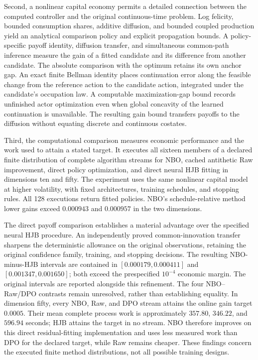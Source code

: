 Second, a nonlinear capital economy permits a detailed connection between the computed controller and the original continuous-time problem. Log felicity, bounded consumption shares, additive diffusion, and bounded coupled production yield an analytical comparison policy and explicit propagation bounds. A policy-specific payoff identity, diffusion transfer, and simultaneous common-path inference measure the gain of a fitted candidate and its difference from another candidate. The absolute comparison with the optimum retains its own anchor gap. An exact finite Bellman identity places continuation error along the feasible change from the reference action to the candidate action, integrated under the candidate's occupation law. A computable maximization-gap bound records unfinished actor optimization even when global concavity of the learned continuation is unavailable. The resulting gain bound transfers payoffs to the diffusion without equating discrete and continuous costates.

Third, the computational comparison measures economic performance and the work used to attain a stated target. It executes all sixteen members of a declared finite distribution of complete algorithm streams for NBO, cached antithetic Raw improvement, direct policy optimization, and direct neural HJB fitting in dimensions ten and fifty. The experiment uses the same nonlinear capital model at higher volatility, with fixed architectures, training schedules, and stopping rules. All 128 executions return fitted policies. NBO's schedule-relative method lower gains exceed $0.000943$ and $0.000957$ in the two dimensions.

The direct payoff comparison establishes a material advantage over the specified neural HJB procedure. An independently proved common-innovation transfer sharpens the deterministic allowance on the original observations, retaining the original confidence family, training, and stopping decisions. The resulting NBO-minus-HJB intervals are contained in $[0.000179,0.000411]$ and $[0.001347,0.001650]$; both exceed the prespecified $10^{-4}$ economic margin. The original intervals are reported alongside this refinement. The four NBO--Raw/DPO contrasts remain unresolved, rather than establishing equality. In dimension fifty, every NBO, Raw, and DPO stream attains the online gain target $0.0005$. Their mean complete process work is approximately $357.80$, $346.22$, and $596.94$ seconds; HJB attains the target in no stream. NBO therefore improves on this direct residual-fitting implementation and uses less measured work than DPO for the declared target, while Raw remains cheaper. These findings concern the executed finite method distributions, not all possible training designs.


